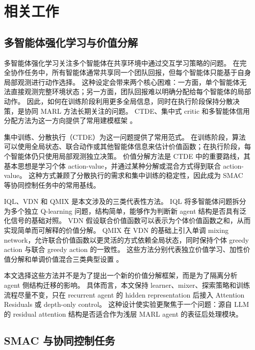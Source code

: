 \section{相关工作}

\subsection{多智能体强化学习与价值分解}

多智能体强化学习关注多个智能体在共享环境中通过交互学习策略的问题。
在完全协作任务中，所有智能体通常共享同一个团队回报，但每个智能体只能基于自身局部观测进行动作选择。
这种设定会带来两个核心困难：一方面，单个智能体无法直接观测完整环境状态；另一方面，团队回报难以明确分配给每个智能体的局部动作。
因此，如何在训练阶段利用更多全局信息，同时在执行阶段保持分散决策，是协同 MARL 方法长期关注的问题。
CTDE、集中式 critic 和多智能体信用分配方法为这一方向提供了常用建模框架 \cite{oliehoek2016concise,lowe2017multiagent,foerster2018counterfactual}。

集中训练、分散执行（CTDE）为这一问题提供了常用范式。
在训练阶段，算法可以使用全局状态、联合动作或其他智能体信息来估计价值函数；在执行阶段，每个智能体仍只使用局部观测独立决策。
价值分解方法是 CTDE 中的重要路线，其基本思想是学习个体 action-value，并通过某种分解或混合方式得到联合 action-value。
这种方式兼顾了分散执行的需求和集中训练的稳定性，因此成为 SMAC 等协同控制任务中的常用基线。

IQL、VDN 和 QMIX 是本文涉及的三类代表性方法。
IQL 将多智能体问题拆分为多个独立 Q-learning 问题，结构简单，能够作为判断新 agent 结构是否具有泛化信号的基础对照。
VDN 假设联合价值函数可以表示为个体价值函数之和，从而实现简单而可解释的价值分解。
QMIX 在 VDN 的基础上引入单调 mixing network，允许联合价值函数以更灵活的方式依赖全局状态，同时保持个体 greedy action 与联合 greedy action 的一致性。
这些方法分别代表独立价值学习、加性价值分解和单调价值混合三类典型设置 \cite{tan1993multiagent,sunehag2018value,rashid2018qmix}。

本文选择这些方法并不是为了提出一个新的价值分解框架，而是为了隔离分析 agent 侧结构迁移的影响。
具体而言，本文保持 learner、mixer、探索策略和训练流程尽量不变，只在 recurrent agent 的 hidden representation 后接入 Attention Residuals 或 depth-only control。
这种设计使实验更聚焦于一个问题：源自 LLM 的 residual attention 结构是否适合作为浅层 MARL agent 的表征后处理模块。

\subsection{SMAC 与协同控制任务}

